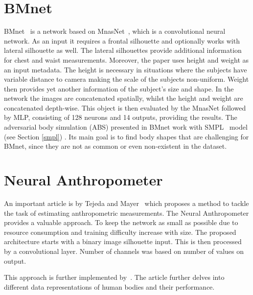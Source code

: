 \section{BMnet}
BMnet~\cite{BodyM} is a network based on MnasNet~\cite{mnasnet}, which is a convolutional neural network.  As an input it requires a frontal silhouette and optionally works with lateral silhouette as well. The lateral silhouettes provide additional information for chest and waist measurements. Moreover, the paper uses height and weight as an input metadata. The height is necessary in situations where the subjects have variable distance to camera making the scale of the subjects non-uniform. Weight then provides yet another information of the subject's size and shape. In the network the images are concatenated spatially, whilst the height and weight are concatenated depth-wise. This object is then evaluated by the MnasNet followed by MLP, consisting of 128 neurons and 14 outputs, providing the results.
The adversarial body simulation (ABS) presented in BMnet work with SMPL~\cite{smpl} model (see Section \ref{smpl}) . Its main goal is to find body shapes that are challenging for BMnet, since they are not as common or even non-existent in the dataset.
 

\section{Neural Anthropometer}
An important article is by Tejeda and Mayer~\cite{source} which proposes a method to tackle the task of estimating anthropometric measurements. The Neural Anthropometer provides a valuable approach. To keep the network as small as possible due to resource consumption and training difficulty increase with size. The proposed architecture starts with a binary image silhouette input. This is then processed by a convolutional layer. Number of channels was based on number of values on output. 

This approach is further implemented by~\cite{super}. The article further delves into different data representations of human bodies and their performance.  
